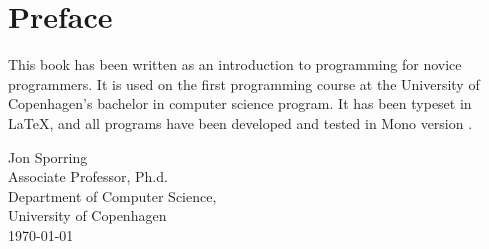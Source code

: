 \chapter{Preface}
This book has been written as an introduction to programming for novice programmers. It is used on the first programming course at the University of Copenhagen's bachelor in computer science program. It has been typeset in \LaTeX, and all programs have been developed and tested in Mono version \monoVersion.

\vspace*{1cm}
Jon Sporring\\
Associate Professor, Ph.d.\\
Department of Computer Science,\\
University of Copenhagen\\
\today\\

